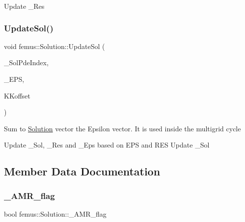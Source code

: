 Update \+\_\+\+Res \mbox{\label{classfemus_1_1_solution_aeb71bfc7bd5c675bf8f9b7c749498fa8}} 
\subsubsection{\texorpdfstring{Update\+Sol()}{UpdateSol()}}
{\footnotesize\ttfamily void femus\+::\+Solution\+::\+Update\+Sol (\begin{DoxyParamCaption}\item[{const vector$<$ unsigned $>$ \&}]{\+\_\+\+Sol\+Pde\+Index,  }\item[{\mbox{\hyperlink{classfemus_1_1_numeric_vector}{Numeric\+Vector}} $\ast$}]{\+\_\+\+E\+PS,  }\item[{const vector$<$ vector$<$ unsigned $>$ $>$ \&}]{K\+Koffset }\end{DoxyParamCaption})}

Sum to \mbox{\hyperlink{classfemus_1_1_solution}{Solution}} vector the Epsilon vector. It is used inside the multigrid cycle

Update \+\_\+\+Sol, \+\_\+\+Res and \+\_\+\+Eps based on E\+PS and R\+ES Update \+\_\+\+Sol 

\subsection{Member Data Documentation}
\mbox{\label{classfemus_1_1_solution_a816938e425db8a87dfa897bbae63fcae}} 
\subsubsection{\texorpdfstring{\+\_\+\+A\+M\+R\+\_\+flag}{\_AMR\_flag}}
{\footnotesize\ttfamily bool femus\+::\+Solution\+::\+\_\+\+A\+M\+R\+\_\+flag}

\mbox{\label{classfemus_1_1_solution_aa471aebee151033f022c807554d25409}} 
